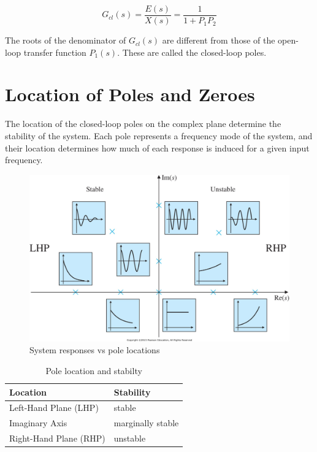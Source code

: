 \documentclass[10pt,conference,compsoc]{IEEEtran}
\begin{document}
\begin{equation}
  G_{cl}(s) = \frac{E(s)}{X(s)} = \frac{1}{1 + P_1 P_2}
\end{equation}

\noindent The roots of the denominator of $G_{cl}(s)$ are different from those
of the open-loop transfer function $P_1(s)$. These are called the closed-loop
poles.

\section{Location of Poles and Zeroes}

\noindent The location of the closed-loop poles on the complex plane determine
the stability of the \gls{system}. Each pole represents a frequency mode of the
\gls{system}, and their location determines how much of each response is induced
for a given input frequency.

\begin{figure}[H]
  \includegraphics[width=\linewidth]{figs/ResponseVsPoleLocations.png}
  \caption{System responses vs pole locations \cite{bib:pole_locations}}
\end{figure}

\begin{table}[ht]
  \caption{Pole location and stabilty}
  \renewcommand{\arraystretch}{1.5}
  \centering
  \begin{tabular}{|ll|}
    \hline
    \textbf{Location} & \textbf{Stability} \\
    \hline
    Left-Hand Plane (LHP) & stable \\
    Imaginary Axis & marginally stable \\
    Right-Hand Plane (RHP) & unstable \\
    \hline
  \end{tabular}
  \label{tab:pole_locations}
\end{table}
\end{document}
